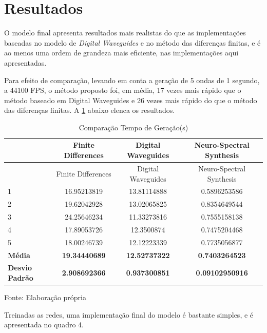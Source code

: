 \documentclass[]{article}
\begin{document}
\hypertarget{resultados}{%
\section{Resultados}\label{resultados}}

O modelo final apresenta resultados mais realistas do que as
implementações baseadas no modelo de \emph{Digital Waveguides} e no
método das diferenças finitas, e é ao menos uma ordem de grandeza mais
eficiente, nas implementações aqui apresentadas.

Para efeito de comparação, levando em conta a geração de 5 ondas de 1
segundo, a 44100 FPS, o método proposto foi, em média, 17 vezes mais
rápido que o método baseado em Digital Waveguides e 26 vezes mais rápido
do que o método das diferenças finitas. A
\cref{tbl:compar} abaixo elenca os resultados.

\begin{longtable}[]{@{}lccc@{}}
\caption{Comparação Tempo de Geração(s)
\label{tbl:compar}}\tabularnewline
\toprule
& Finite Differences & Digital Waveguides & Neuro-Spectral
Synthesis\tabularnewline
\midrule
\endfirsthead
\toprule
& Finite Differences & Digital Waveguides & Neuro-Spectral
Synthesis\tabularnewline
\midrule
\endhead
1 & 16.95213819 & 13.81114888 & 0.5896253586\tabularnewline
2 & 19.62042928 & 13.02065825 & 0.8354649544\tabularnewline
3 & 24.25646234 & 11.33273816 & 0.7555158138\tabularnewline
4 & 17.89053726 & 12.3500874 & 0.7475204468\tabularnewline
5 & 18.00246739 & 12.12223339 & 0.7735056877\tabularnewline
\textbf{Média} & \textbf{19.34440689} & \textbf{12.52737322} &
\textbf{0.7403264523}\tabularnewline
\textbf{Desvio Padrão} & \textbf{2.908692366} & \textbf{0.937300851} &
\textbf{0.09102950916}\tabularnewline
\bottomrule
\end{longtable}

Fonte: Elaboração própria

Treinadas as redes, uma implementação final do modelo é bastante
simples, e é apresentada no quadro 4.
\end{document}
